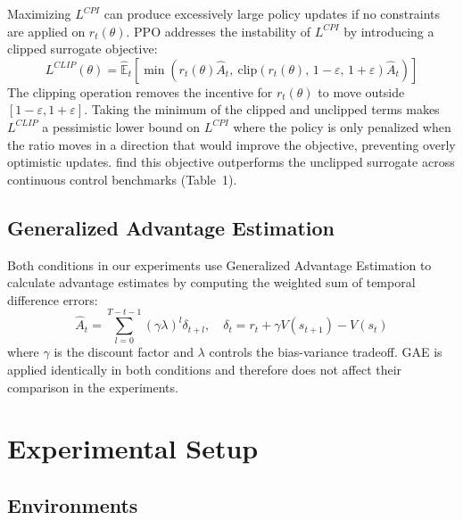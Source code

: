 \documentclass{article}
\begin{document}
Maximizing $L^{CPI}$ can produce excessively large policy updates if no constraints are applied on $r_t(\theta)$. PPO addresses the instability of $L^{CPI}$ by introducing a clipped surrogate objective:
\begin{equation}
    L^{CLIP}(\theta) = \hat{\mathbb{E}}_t \left[ \min\left( r_t(\theta)\hat{A}_t,\
    \text{clip}(r_t(\theta),\, 1-\varepsilon,\, 1+\varepsilon)\hat{A}_t \right) \right]
\end{equation}
The clipping operation removes the incentive for $r_t(\theta)$ to move outside $[1-\varepsilon, 1+\varepsilon]$. Taking the minimum of the clipped and unclipped terms makes $L^{CLIP}$ a pessimistic lower bound on $L^{CPI}$ where the policy is only penalized when the ratio moves in a direction that would improve the objective, preventing overly optimistic updates. \citet{schulman2017ppo} find this objective outperforms the unclipped surrogate across continuous control benchmarks (Table~1).

\subsection{Generalized Advantage Estimation}

Both conditions in our experiments use Generalized Advantage Estimation
\citep{schulman2015gae} to calculate advantage estimates by computing the weighted sum of temporal difference errors:
\begin{equation}
    \hat{A}_t = \sum_{l=0}^{T-t-1} (\gamma\lambda)^l \delta_{t+l},
    \quad \delta_t = r_t + \gamma V(s_{t+1}) - V(s_t)
\end{equation}
where $\gamma$ is the discount factor and $\lambda$ controls the bias-variance tradeoff. GAE is applied identically in both conditions and therefore does not affect their comparison in the experiments.

\section{Experimental Setup}

\subsection{Environments}
\end{document}
